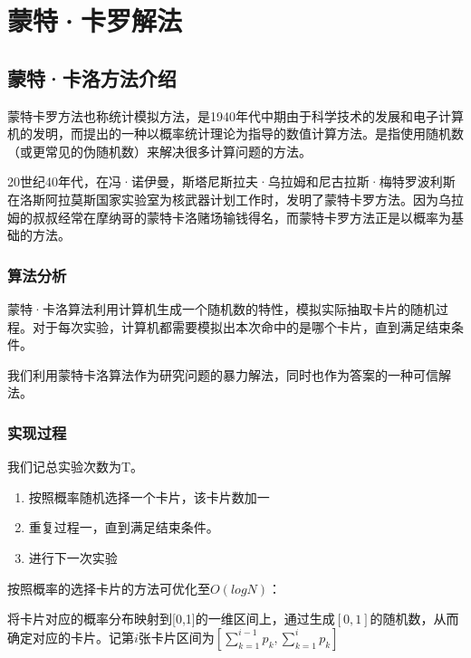 \documentclass[master]{thesis-uestc}
\begin{document}
\chapter{蒙特·卡罗解法}
\section{蒙特·卡洛方法介绍}
蒙特卡罗方法也称统计模拟方法，是1940年代中期由于科学技术的发展和电子计算机的发明，而提出的一种以概率统计理论为指导的数值计算方法。是指使用随机数（或更常见的伪随机数）来解决很多计算问题的方法。 

20世纪40年代，在冯·诺伊曼，斯塔尼斯拉夫·乌拉姆和尼古拉斯·梅特罗波利斯在洛斯阿拉莫斯国家实验室为核武器计划工作时，发明了蒙特卡罗方法。因为乌拉姆的叔叔经常在摩纳哥的蒙特卡洛赌场输钱得名，而蒙特卡罗方法正是以概率为基础的方法。 


\subsection{算法分析}

蒙特·卡洛算法利用计算机生成一个随机数的特性，模拟实际抽取卡片的随机过程。对于每次实验，计算机都需要模拟出本次命中的是哪个卡片，直到满足结束条件。

我们利用蒙特卡洛算法作为研究问题的暴力解法，同时也作为答案的一种可信解法。

\subsection{实现过程}

我们记总实验次数为T。

\begin{enumerate}
    \item 按照概率随机选择一个卡片，该卡片数加一
    \item 重复过程一，直到满足结束条件。
    \item 进行下一次实验
\end{enumerate}

按照概率的选择卡片的方法可优化至$O(logN)$：
    
将卡片对应的概率分布映射到[0,1]的一维区间上，通过生成$[0,1]$的随机数，从而确定对应的卡片。记第$i$张卡片区间为$[\sum\limits_{k=1}^{i-1}{p_k},\sum\limits_{k=1}^{i}{p_k}]$
\end{document}
